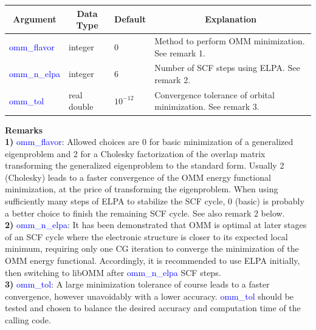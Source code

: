 \documentclass{report}
\begin{document}
\begin{tabular}[]{|p{30mm}|p{20mm}|p{15mm}|p{100mm}|}
\hline
\multicolumn{1}{|c|}{\textbf{Argument}} & \multicolumn{1}{c|}{\textbf{Data Type}} & \multicolumn{1}{c|}{\textbf{Default}} & \multicolumn{1}{c|}{\textbf{Explanation}}\\
\hline
\textcolor{blue}{omm\_flavor}  & integer     & 0          & Method to perform OMM minimization.  See remark 1.\\
\hline
\textcolor{blue}{omm\_n\_elpa} & integer     & 6          & Number of SCF steps using ELPA.  See remark 2.\\
\hline
\textcolor{blue}{omm\_tol}     & real double & $10^{-12}$ & Convergence tolerance of orbital minimization.  See remark 3.\\
\hline
\end{tabular}

\bigskip
\textbf{Remarks}\\

\textbf{1)} \textcolor{blue}{omm\_flavor}:  Allowed choices are 0 for basic minimization of a generalized eigenproblem and 2 for a Cholesky factorization of the overlap matrix transforming the generalized eigenproblem to the standard form.  Usually 2 (Cholesky) leads to a faster convergence of the OMM energy functional minimization, at the price of transforming the eigenproblem.  When using sufficiently many steps of ELPA to stabilize the SCF cycle, 0 (basic) is probably a better choice to finish the remaining SCF cycle.  See also remark 2 below.\\

\textbf{2)} \textcolor{blue}{omm\_n\_elpa}:  It has been demonstrated that OMM is optimal at later stages of an SCF cycle where the electronic structure is closer to its expected local minimum, requiring only one CG iteration to converge the minimization of the OMM energy functional.  Accordingly, it is recommended to use ELPA initially, then switching to libOMM after \textcolor{blue}{omm\_n\_elpa} SCF steps.\\

\textbf{3)} \textcolor{blue}{omm\_tol}:  A large minimization tolerance of course leads to a faster convergence, however unavoidably with a lower accuracy.  \textcolor{blue}{omm\_tol} should be tested and chosen to balance the desired accuracy and computation time of the calling code.\\
\end{document}
